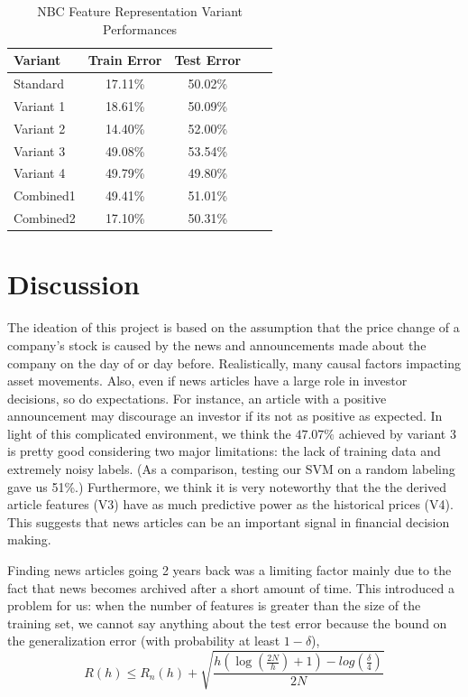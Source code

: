 \documentclass{article}
\begin{document}
\begin{table}[t]
\caption{NBC Feature Representation Variant Performances}
\label{nbc-results}
\begin{center}
\begin{small}
\begin{sc}
\begin{tabular}{lcccr}
\hline
\abovespace\belowspace
Variant & Train Error & Test Error \\
\hline
\abovespace
Standard    & 17.11\% & 50.02\% \\
Variant 1    & 18.61\% & 50.09\% \\
Variant 2    & 14.40\% & 52.00\% \\
Variant 3    & 49.08\% & 53.54\% \\
Variant 4    & 49.79\% & 49.80\% \\
Combined1    & 49.41\% & 51.01\% \\
\belowspace
Combined2    & 17.10\% & 50.31\% \\
\hline
\end{tabular}
\end{sc}
\end{small}
\end{center}
\vskip -0.3in
\end{table}


\section{Discussion}

The ideation of this project is based on the assumption that the price change of a company's stock is caused by the news and announcements made about the company on the day of or day before. Realistically, many causal factors impacting asset movements. Also, even if news articles have a large role in investor decisions, so do expectations. For instance, an article with a positive announcement may discourage an investor if its not as positive as expected. In light of this complicated environment, we think the $47.07\%$ achieved by variant 3 is pretty good considering two major limitations: the lack of training data and extremely noisy labels. (As a comparison, testing our SVM on a random labeling gave us 51\%.) Furthermore, we think it is very noteworthy that the the derived article features (V3) have as much predictive power as the historical prices (V4). This suggests that news articles can be an important signal in financial decision making.

Finding news articles going 2 years back was a limiting factor mainly due to the fact that news becomes archived after a short amount of time. This introduced a problem for us: when the number of features is greater than the size of the training set, we cannot say anything about the test error because the bound on the generalization error (with probability at least $1-\delta$), 
$$ R(h) \leq R_n(h) + \sqrt{\dfrac{h(\log(\frac{2N}h)+1)-log(\frac \delta 4)}{2N}}$$
\end{document}
